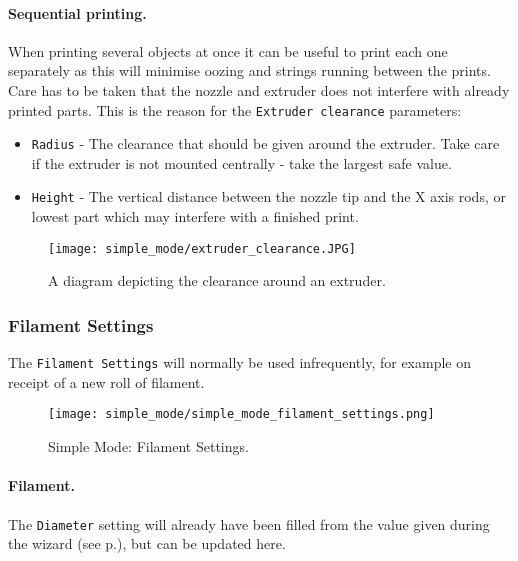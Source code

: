 \paragraph{Sequential printing.} %
\label{par:simple_sequential_printing}
When printing several objects at once it can be useful to print each one separately as this will minimise oozing and strings running between the prints.  Care has to be taken that the nozzle and extruder does not interfere with already printed parts.  This is the reason for the \texttt{Extruder clearance} parameters: 
\begin{itemize}
	\item \texttt{Radius}  - The clearance that should be given around the extruder.  Take care if the extruder is not mounted centrally - take the largest safe value.
	\item \texttt{Height}  - The vertical distance between the nozzle tip and the X axis rods, or lowest part which may interfere with a finished print.
\end{itemize}

\begin{figure}[H]
\centering
\texttt{[image: simple\_mode/extruder\_clearance.JPG]}
\caption{A diagram depicting the clearance around an extruder.}
\label{fig:a_diagram_depicting_extruder_clearance}
\end{figure}


\subsubsection{Filament Settings}

The \texttt{Filament Settings} will normally be used infrequently, for example on receipt of a new roll of filament.

\begin{figure}[H]
\centering
\texttt{[image: simple\_mode/simple\_mode\_filament\_settings.png]}
\caption{Simple Mode: Filament Settings.}
\label{fig:simple_mode_filament_settings}
\end{figure}

\paragraph{Filament.} %
\label{par:filament}
The \texttt{Diameter} setting will already have been filled from the value given during the wizard (see p.\pageref{sub:4_filament_diameter}), but can be updated here.

